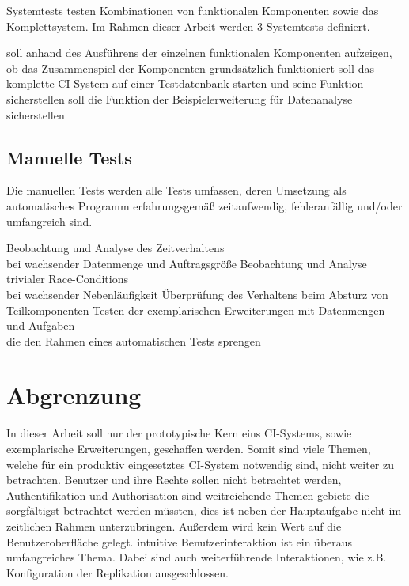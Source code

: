 Systemtests testen Kombinationen von funktionalen Komponenten sowie das Komplettsystem.
Im Rahmen dieser Arbeit werden 3 Systemtests definiert.


\begin{description}
  \dhitem[Komponentendurchlauf]
    soll anhand des Ausführens der einzelnen funktionalen Komponenten aufzeigen,
    ob das Zusammenspiel der Komponenten grunds\"atzlich funktioniert
  \dhitem[Komplettstystem]
    soll das komplette CI-System auf einer Testdatenbank starten
    und seine Funktion sicherstellen
    soll die Funktion der Beispielerweiterung f\"ur Datenanalyse sicherstellen
\end{description}

\subsection{Manuelle Tests}

Die manuellen Tests werden alle Tests umfassen,
deren Umsetzung als automatisches Programm erfahrungsgemäß zeitaufwendig,
fehleranf\"allig und/oder umfangreich sind.

\begin{description}
    Beobachtung und Analyse des Zeitverhaltens \\
    bei wachsender Datenmenge und Auftragsgröße
    Beobachtung und Analyse trivialer Race-Conditions \\
    bei wachsender Nebenl\"aufigkeit
    \"Uberpr\"ufung des Verhaltens beim Absturz von Teilkomponenten
    Testen der exemplarischen Erweiterungen mit Datenmengen und Aufgaben \\
    die den Rahmen eines automatischen Tests sprengen
\end{description}


\section{Abgrenzung}

In dieser Arbeit soll nur der prototypische Kern eins CI-Systems,
sowie exemplarische Erweiterungen, geschaffen werden.
Somit sind viele Themen, welche für ein produktiv eingesetztes CI-System notwendig
sind, nicht weiter zu betrachten.
Benutzer und ihre Rechte sollen nicht betrachtet werden,
Authentifikation und Authorisation sind weitreichende Themen-gebiete
die sorgf\"altigst betrachtet werden m\"ussten,
dies ist neben der Hauptaufgabe nicht im zeitlichen Rahmen unterzubringen.
Außerdem wird kein Wert auf die Benutzeroberfläche gelegt.
intuitive Benutzerinteraktion ist ein \"uberaus umfangreiches Thema.
Dabei sind auch weiterführende Interaktionen,
wie z.B. Konfiguration der Replikation ausgeschlossen.


